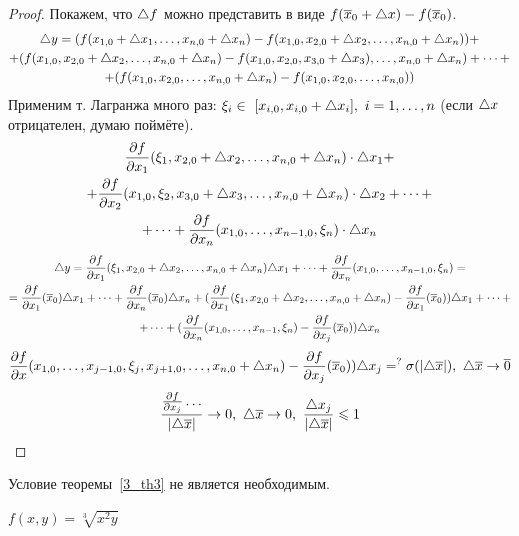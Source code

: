 \begin{proof}
	Покажем, что $\triangle f$ можно представить в виде $f(\overline x_0+\triangle x)-f(\overline x_0)$.
	\begin{multline*}
		\triangle y=(f(x_{1,0}+\triangle x_1,\dots,x_{n,0}+\triangle x_n)-f(x_{1,0},x_{2,0}+\triangle x_2,\dots,x_{n,0}+\triangle x_n))+\\
		+(f(x_{1,0},x_{2,0}+\triangle x_2,\dots,x_{n,0}+\triangle x_n)-f(x_{1,0},x_{2,0},x_{3,0}+\triangle x_3),\dots,x_{n,0}+\triangle x_n)+\dots+\\
		+(f(x_{1,0},x_{2,0},\dots,x_{n,0}+\triangle x_n)-f(x_{1,0},x_{2,0},\dots,x_{n,0}))
	\end{multline*}
	Применим т. Лагранжа много раз: $\xi_i\in\ [x_{i,0},x_{i,0}+\tr x_i],\ i=1,\dots,n$ (если $\triangle x$ отрицателен, думаю поймёте).
	\begin{multline*}
		\frac{\partial f}{\partial x_1}(\xi_1,x_{2,0}+\triangle x_2,\dots,x_{n,0}+\triangle x_n)\cdot\triangle x_1+\\
		+\frac{\partial f}{\partial x_2}(x_{1,0},\xi_2,x_{3,0}+\triangle x_3,\dots,x_{n,0}+\triangle x_n)\cdot\triangle x_2+\dots+\\
		+\dots+\frac{\partial f}{\partial x_n}(x_{1,0},\dots,x_{n-1,0},\xi_n)\cdot\triangle x_n
	\end{multline*}
	\begin{multline*}
		\triangle y=\frac{\partial f}{\partial x_1}(\xi_1,x_{2,0}+\triangle x_2,\dots,x_{n,0}+\triangle x_n)\triangle x_1+\dots+\frac{\partial f}{\partial x_n}(x_{1,0},\dots,x_{n-1,0},\xi_n)=\\
		=\frac{\partial f}{\partial x_1}(\overline x_0)\triangle x_1+\dots+\frac{\partial f}{\partial x_n}(\overline x_0)\triangle x_n+(\frac{\partial f}{\partial x_1}(\xi_1,x_{2,0}+\triangle x_2,\dots,x_{n,0}+\triangle x_n)-\frac{\partial f}{\partial x_1}(\overline x_0))\triangle x_1+\dots+\\
		+\dots+(\frac{\partial f}{\partial x_n}(x_{1,0},\dots,x_{n-1},\xi_n)-\frac{\partial f}{\partial x_j}(\overline x_0))\triangle x_n
	\end{multline*}
	\[\frac{\partial f}{\partial x}(x_{1,0},\dots,x_{j-1,0},\xi_j,x_{j+1,0},\dots,x_{n,0}+\triangle x_n)-\frac{\partial f}{\partial x_j}(\overline x_0))\triangle x_j=^?\sigma(|\triangle\overline x|),\ \triangle\overline x\rightarrow\overline0\]
	\[\frac{\frac{\partial f}{\partial x_j}\dots}{|\triangle\overline x|}\rightarrow0,\ \triangle\overline x\rightarrow0,\ \frac{\triangle x_j}{|\triangle\overline x|}\leqslant1\]
\end{proof}
\begin{note}
	Условие теоремы{~\eqref{3_th3}} не является необходимым.
\end{note}
\begin{example}
	$f(x,y)=\sqrt[3]{x^2y}$
\end{example}